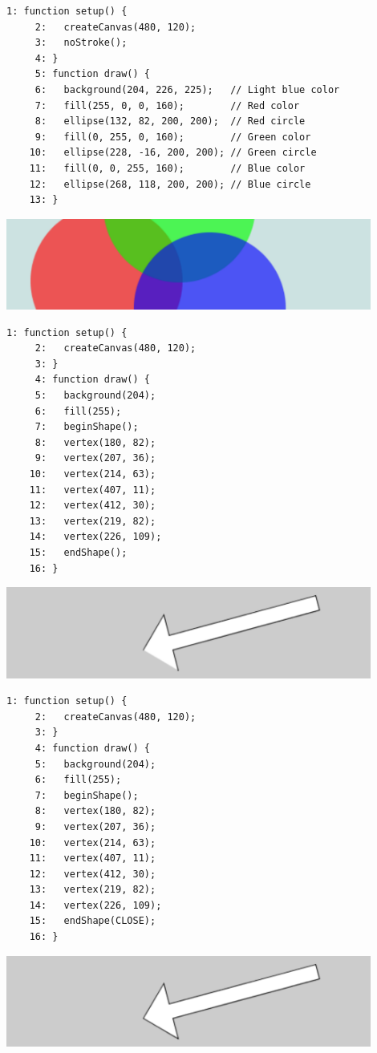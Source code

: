 \documentclass[a4j]{ltjsarticle}
\begin{document}
\begin{lstlisting}[caption=Ex\_03\_18.js]
     1: function setup() {
     2:   createCanvas(480, 120);
     3:   noStroke();
     4: }
     5: function draw() {
     6:   background(204, 226, 225);   // Light blue color
     7:   fill(255, 0, 0, 160);        // Red color
     8:   ellipse(132, 82, 200, 200);  // Red circle
     9:   fill(0, 255, 0, 160);        // Green color
    10:   ellipse(228, -16, 200, 200); // Green circle
    11:   fill(0, 0, 255, 160);        // Blue color
    12:   ellipse(268, 118, 200, 200); // Blue circle
    13: }
\end{lstlisting}
\includegraphics[height=3cm]{image/Ex_03_18.pdf}
\begin{lstlisting}[caption=Ex\_03\_19.js]
     1: function setup() {
     2:   createCanvas(480, 120);
     3: }
     4: function draw() {
     5:   background(204);
     6:   fill(255);
     7:   beginShape();
     8:   vertex(180, 82);
     9:   vertex(207, 36);
    10:   vertex(214, 63);
    11:   vertex(407, 11);
    12:   vertex(412, 30);
    13:   vertex(219, 82);
    14:   vertex(226, 109);
    15:   endShape();
    16: }
\end{lstlisting}
\includegraphics[height=3cm]{image/Ex_03_19.pdf}
\begin{lstlisting}[caption=Ex\_03\_20.js]
     1: function setup() {
     2:   createCanvas(480, 120);
     3: }
     4: function draw() {
     5:   background(204);
     6:   fill(255);
     7:   beginShape();
     8:   vertex(180, 82);
     9:   vertex(207, 36);
    10:   vertex(214, 63);
    11:   vertex(407, 11);
    12:   vertex(412, 30);
    13:   vertex(219, 82);
    14:   vertex(226, 109);
    15:   endShape(CLOSE);
    16: }
\end{lstlisting}
\includegraphics[height=3cm]{image/Ex_03_20.pdf}
\end{document}
